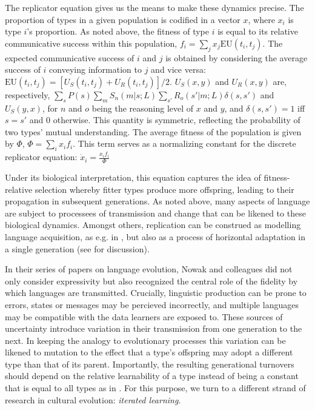 \documentclass[a4paper]{article}
\begin{document}
The replicator equation gives us the means to make these dynamics precise. The proportion of types in a given population is codified in a vector $x$, where $x_i$ is type $i$'s proportion. As noted above, the fitness of type $i$ is equal to its relative communicative success within this population, $f_i = \sum_j x_j \text{EU}(t_i,t_j)$. The expected communicative success of $i$ and $j$ is obtained by considering the average success of $i$ conveying information to $j$ and vice versa: $\text{EU}(t_i,t_j) = [U_S(t_i,t_j) + U_R(t_i,t_j)]/2$. $U_S(x,y)$ and $U_R(x,y)$ are, respectively, $\sum_s P(s)\sum_m S_n(m|s;L) \sum_{s'} R_o(s'|m;L) \delta(s,s')$ and $U_S(y,x)$, for $n$ and $o$ being the reasoning level of $x$ and $y$, and $\delta(s,s') = 1$ iff $s = s'$ and $0$ otherwise. This quantity is symmetric, reflecting the probability of two types' mutual understanding. The average fitness of the population is given by $\Phi$, $\Phi = \sum_i x_i f_i$. This term serves as a normalizing constant for the discrete replicator equation: $\dot{x}_i = \frac{x_i f_i}{\Phi}$ 

Under its biological interpretation, this equation captures the idea of fitness-relative selection whereby fitter types produce more offspring, leading to their propagation in subsequent generations. As noted above, many aspects of language are subject to processees of transmission and change that can be likened to these biological dynamics. Amongst others, replication can be construed as modelling language acquisition, as e.g. in \citealt{nowak+etal:2002}, but also as a process of horizontal adaptation in a single generation (see \citealt[\S3.3]{benz+etal:2005b} for discussion).

In their series of papers on language evolution, Nowak and colleagues did not only consider expressivity but also recognized the central role of the fidelity by which languages are transmitted. Crucially, linguistic production can be prone to errors, states or messages may be percieved incorrectly, and multiple languages may be compatible with the data learners are exposed to. These sources of uncertainty introduce variation in their transmission from one generation to the next. In keeping the analogy to evolutionary processes this variation can be likened to mutation to the effect that a type's offspring may adopt a different type than that of its parent. Importantly, the resulting generational turnovers should depend on the relative learnability of a type instead of being a constant that is equal to all types as in \citet{nowak+etal:2002}. For this purpose, we turn to a different strand of research in cultural evolution: {\em iterated learning}. 
\end{document}
